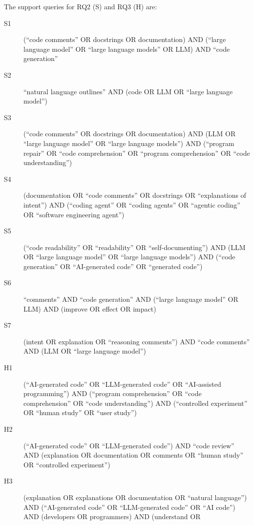 The support queries for RQ2 (S) and RQ3 (H) are:
\begin{description}
  \item[S1] (\enquote{code comments} OR docstrings OR documentation) AND
    (\enquote{large language model} OR \enquote{large language models} OR LLM)
    AND \enquote{code generation}
  \item[S2] \enquote{natural language outlines} AND (code OR LLM OR
    \enquote{large language model})
  \item[S3] (\enquote{code comments} OR docstrings OR documentation) AND (LLM
    OR \enquote{large language model} OR \enquote{large language models}) AND
    (\enquote{program repair} OR \enquote{code comprehension} OR
    \enquote{program comprehension} OR \enquote{code understanding})
  \item[S4] (documentation OR \enquote{code comments} OR docstrings OR
    \enquote{explanations of intent}) AND (\enquote{coding agent} OR
    \enquote{coding agents} OR \enquote{agentic coding} OR \enquote{software
    engineering agent})
  \item[S5] (\enquote{code readability} OR \enquote{readability} OR
    \enquote{self-documenting}) AND (LLM OR \enquote{large language model} OR
    \enquote{large language models}) AND (\enquote{code generation} OR
    \enquote{AI-generated code} OR \enquote{generated code})
  \item[S6] \enquote{comments} AND \enquote{code generation} AND
    (\enquote{large language model} OR LLM) AND (improve OR effect OR impact)
  \item[S7] (intent OR explanation OR \enquote{reasoning comments}) AND
    \enquote{code comments} AND (LLM OR \enquote{large language model})
  \item[H1] (\enquote{AI-generated code} OR \enquote{LLM-generated code} OR
    \enquote{AI-assisted programming}) AND (\enquote{program comprehension} OR
    \enquote{code comprehension} OR \enquote{code understanding}) AND
    (\enquote{controlled experiment} OR \enquote{human study} OR \enquote{user
    study})
  \item[H2] (\enquote{AI-generated code} OR \enquote{LLM-generated code}) AND
    \enquote{code review} AND (explanation OR documentation OR comments OR
    \enquote{human study} OR \enquote{controlled experiment})
  \item[H3] (explanation OR explanations OR documentation OR \enquote{natural
    language}) AND (\enquote{AI-generated code} OR \enquote{LLM-generated code}
    OR \enquote{AI code}) AND (developers OR programmers) AND (understand OR

\end{description}
